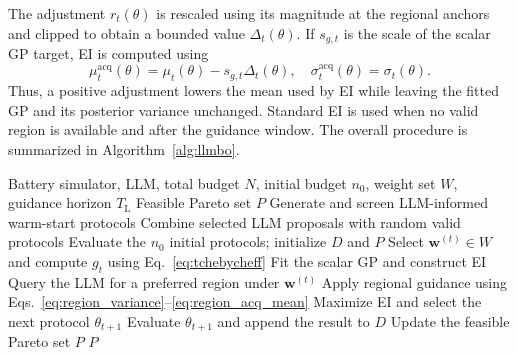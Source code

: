 The adjustment $r_t(\theta)$ is rescaled using its magnitude at the regional
anchors and clipped to obtain a bounded value $\Delta_t(\theta)$. If
$s_{g,t}$ is the scale of the scalar GP target, EI is computed using
\begin{equation}
 \mu_t^{\mathrm{acq}}(\theta)
 =\mu_t(\theta)-s_{g,t}\Delta_t(\theta),
 \quad
 \sigma_t^{\mathrm{acq}}(\theta)=\sigma_t(\theta).
 \label{eq:region_acq_mean}
\end{equation}
Thus, a positive adjustment lowers the mean used by EI while leaving the
fitted GP and its posterior variance unchanged. Standard EI is used when no
valid region is available and after the guidance window.
The overall procedure is summarized in Algorithm~\ref{alg:llmbo}.

\begin{algorithm}[!t]
\caption{LLMBO-MO}
\label{alg:llmbo}
\footnotesize
\begin{algorithmic}[1]
\Require Battery simulator, LLM, total budget $N$, initial budget $n_0$, weight set $W$, guidance horizon $T_{\mathrm L}$
\Ensure Feasible Pareto set $P$
\State Generate and screen LLM-informed warm-start protocols
\State Combine selected LLM proposals with random valid protocols
\State Evaluate the $n_0$ initial protocols; initialize $D$ and $P$
    \State Select $\mathbf w^{(t)}\in W$ and compute $g_t$ using Eq.~\eqref{eq:tchebycheff}
    \State Fit the scalar GP and construct EI
        \State Query the LLM for a preferred region under $\mathbf w^{(t)}$
            \State Apply regional guidance using Eqs.~\eqref{eq:region_variance}--\eqref{eq:region_acq_mean}
        \EndIf
    \EndIf
    \State Maximize EI and select the next protocol $\theta_{t+1}$
    \State Evaluate $\theta_{t+1}$ and append the result to $D$
    \State Update the feasible Pareto set $P$
\EndFor
\State \Return $P$
\end{algorithmic}
\end{algorithm}
